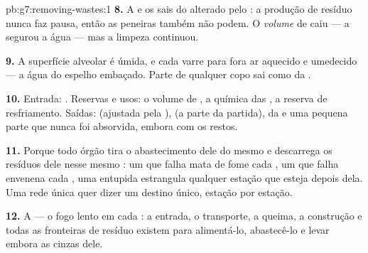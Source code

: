 \begin{solution}{pb:g7:removing-wastes:1}
\textbf{8.} A  e os sais do  alterado pelo : a produção
de resíduo nunca faz pausa, então as peneiras também não podem. O
\emph{volume} de  caiu --- a  segurou a água --- mas a
limpeza continuou.

\textbf{9.} A superfície alveolar é úmida, e cada  varre
para fora ar aquecido e umedecido --- a água do espelho embaçado. Parte
de qualquer copo sai como  da .

\textbf{10.} Entrada: . Reservas e usos: o volume de
, a química das , a reserva de resfriamento. Saídas:
 (ajustada pela ),  (a parte da partida), 
da  e uma pequena parte que nunca foi absorvida, embora com
os restos.

\textbf{11.} Porque todo órgão tira o abastecimento dele do mesmo
 e descarrega os resíduos dele nesse mesmo : um  que
falha mata de fome cada , um  que falha envenena cada
, uma  entupida estrangula qualquer estação que esteja
depois dela. Uma rede única quer dizer um destino único, estação por
estação.

\textbf{12.} A  --- o fogo lento em cada : a entrada, o
transporte, a queima, a construção e todas as fronteiras de resíduo
existem para alimentá-lo, abastecê-lo e levar embora as cinzas dele.
\end{solution}
